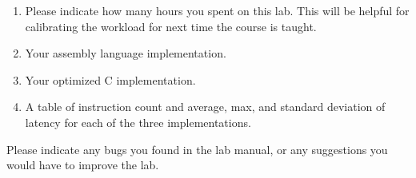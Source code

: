 \documentclass{../../e85}
\date{2019 April 15 (Monday)}
\author{}
\begin{document}
\begin{enumerate}
\item Please indicate how many hours you spent on this lab.  This will
  be helpful for calibrating the workload for next time the course is
  taught.

  \begin{solution}

  \end{solution}

\item Your assembly language implementation.

  \begin{solution}

  \end{solution}

\item Your optimized C implementation.

  \begin{solution}

  \end{solution}

\item A table of instruction count and average, max, and standard
  deviation of latency for each of the three implementations.

  \begin{solution}

  \end{solution}
\end{enumerate}

Please indicate any bugs you found in the lab manual, or any
suggestions you would have to improve the lab.

\begin{solution}

\end{solution}
\end{document}
